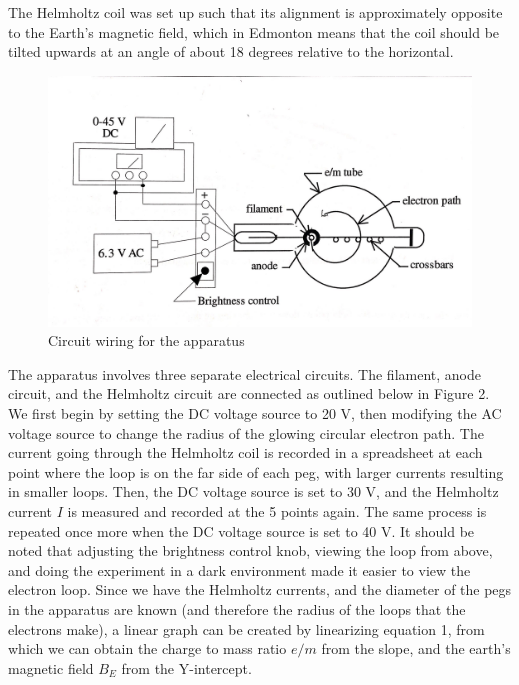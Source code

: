 \documentclass[letterpaper]{article}
\begin{document}
The Helmholtz coil was set up such that its alignment is approximately
opposite to the Earth's magnetic field, which in Edmonton means that the coil
should be tilted upwards at an angle of about 18 degrees relative to the horizontal.
\begin{figure}[h!]
    \centering
    \includegraphics[width=.9\textwidth]{fig2.jpg}
    \caption{Circuit wiring for the apparatus \cite{labmanual}}
\end{figure}
The apparatus involves three separate electrical circuits.
The filament, anode circuit, and the Helmholtz circuit are connected as outlined
below in Figure 2. We first begin by setting the DC voltage source to 20 V, then modifying the
AC voltage source to change the radius of the glowing circular electron path. The current going through the
Helmholtz coil is recorded in a spreadsheet at each point where the loop is on the far side of each peg, with larger
currents resulting in smaller loops. Then,
the DC voltage source is set to 30 V, and the Helmholtz current $I$ is measured and recorded at the 5 points again.
The same process is repeated once more when the DC voltage source is set to 40 V. It should be noted
that adjusting the brightness control knob, viewing the loop from above, and doing the experiment in a dark
environment made it easier to view the electron loop.
Since we have the Helmholtz currents, and the diameter of the pegs in the apparatus are known (and therefore
the radius of the loops that the electrons make), a linear graph can be created by linearizing equation 1,
from which we can obtain the charge to mass ratio $e/m$ from the slope, and the earth's magnetic field $B_E$
from the Y-intercept.
\end{document}
